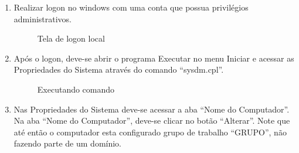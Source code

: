 \begin{enumerate}
	\item {Realizar logon no windows com uma conta que possua privilégios administrativos.}

	\begin{figure}[ht]
   			\centering
   			\caption{Tela de logon local}
    		\label{logon_local_adm}
	\end{figure}

	\item {Após o logon, deve-se abrir o programa Executar no menu Iniciar e acessar as Propriedades do Sistema através do comando “sysdm.cpl”.}

	\begin{figure}[ht]
   			\centering
   			\caption{Executando comando}
    		\label{iniciar_executar}
	\end{figure}

	\item {Nas Propriedades do Sistema deve-se acessar a aba “Nome do Computador”. Na aba “Nome do Computador”, deve-se clicar no botão “Alterar”. Note que até então o computador esta configurado grupo de trabalho “GRUPO”, não fazendo parte de um domínio.

}
\end{enumerate}
